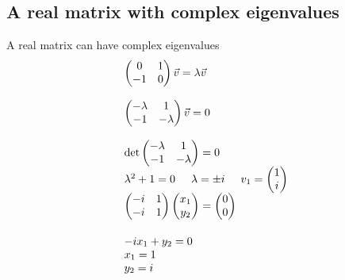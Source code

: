 \subsection{A real matrix with complex eigenvalues}
A real matrix can have complex eigenvalues
\begin{equation*}
\begin{array}{l}
  \begin{pmatrix}
      0 & 1 \\
      -1 & 0
  \end{pmatrix}
  \Vec{v} = \lambda\Vec{v}\\
  \\
  \begin{pmatrix}
      -\lambda & 1 \\
      -1 & -\lambda
  \end{pmatrix}
  \Vec{v} =0\\
  \\
  \det
  \begin{pmatrix}
      -\lambda & 1 \\
      -1 & -\lambda
  \end{pmatrix}
  =0\\
  \lambda^2+1=0
  \hspace{0.5cm}
  \lambda = \pm i
  \hspace{0.5cm}
  v_{1}=
  \begin{pmatrix}
      1 \\
      i
  \end{pmatrix}\\
  \vspace{0.5cm}
  \begin{pmatrix}
      -i & 1 \\
      -i & 1 
  \end{pmatrix}
  \begin{pmatrix}
      x_{1} \\
      y_{2}
  \end{pmatrix}
  =
  \begin{pmatrix}
      0 \\
      0 
  \end{pmatrix}\\
  -ix_{1}+y_{2} =0\\
  x_{1} =1\\
  y_{2} =i
\end{array}
\end{equation*}


